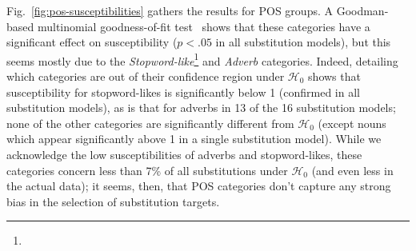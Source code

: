 \begin{new}

Fig.~\ref{fig:pos-susceptibilities} gathers the results for POS groups.
A Goodman-based multinomial goodness-of-fit test~\citep{goodman_simultaneous_1965} shows that these categories have a significant effect on susceptibility ($p < .05$ in all substitution models), but this seems mostly due to the \emph{Stopword-like}\footnote{
}
and \emph{Adverb} categories.
Indeed, detailing which categories are out of their confidence region under $\mathcal{H}_0$ shows that susceptibility for stopword-likes is significantly below 1 (confirmed in all substitution models), as is that for adverbs in 13 of the 16 substitution models;
none of the other categories are significantly different from $\mathcal{H}_0$ (except nouns which appear significantly above 1 in a single substitution model).
While we acknowledge the low susceptibilities of adverbs and stopword-likes, these categories concern less than 7\% of all substitutions under $\mathcal{H}_0$ (and even less in the actual data);
it seems, then, that POS categories don't capture any strong bias in the selection of substitution targets.

\end{new}

